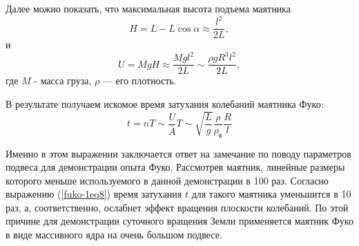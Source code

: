 \documentclass[All.tex]{subfiles}
\begin{document}
	Далее можно показать, что максимальная высота подъема маятника
	\begin{equation}\label{fuko-1eq6}
	H = L - L \cos\alpha \approx \frac{l^{2}}{2L},
	\end{equation}
	и
	\begin{equation}\label{fuko-1eq7}
	U = MgH \approx \frac{ Mgl^2}{2L} \sim \frac{\rho g R^{3}l^{2}}{2L},
	\end{equation}
	где $ M $ - масса груза, $ \rho $ — его плотность. 
	
	В результате получаем искомое время затухания колебаний маятника Фуко:
	\begin{equation}\label{fuko-1eq8}
	t = nT \sim  \frac{U}{\bar{A}}T \sim\sqrt{\frac{L}{g}} \frac{\rho}{\rho_{\text{в}}}\frac{R}{l}
	\end{equation}
	
	Именно в этом выражении заключается ответ на замечание по поводу параметров подвеса для демонстрации опыта Фуко.
	Рассмотрев маятник, линейные размеры которого меньше используемого в данной демонстрации в 100 раз.
	Согласно выражению (\ref{fuko-1eq8}) время затухания $ t $ для такого маятника уменьшится в 10 раз, а, соответственно, ослабнет эффект вращения плоскости колебаний.
	По этой причине для демонстрации суточного вращения Земли применяется маятник Фуко в виде массивного ядра на очень большом подвесе.
	
\end{document}
